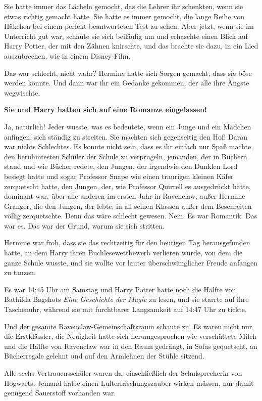 {Sie hatte immer das Lächeln gemocht, das die Lehrer ihr schenkten, wenn sie etwas richtig gemacht hatte. Sie hatte es immer gemocht, die lange Reihe von Häkchen bei einem perfekt beantworteten Test zu sehen. Aber jetzt, wenn sie im Unterricht gut war, schaute sie sich beiläufig um und erhaschte einen Blick auf Harry Potter, der mit den Zähnen knirschte, und das brachte sie dazu, in ein Lied auszubrechen, wie in einem Disney-Film.

Das war schlecht, nicht wahr? Hermine hatte sich Sorgen gemacht, dass sie böse werden könnte. Und dann war ihr ein Gedanke gekommen, der alle ihre Ängste wegwischte.

\textbf{Sie und Harry hatten sich auf eine Romanze eingelassen!}

Ja, natürlich! Jeder wusste, was es bedeutete, wenn ein Junge und ein Mädchen anfingen, sich ständig zu streiten. Sie machten sich gegenseitig den Hof! Daran war nichts Schlechtes. Es konnte nicht sein, dass es ihr einfach nur Spaß machte, den berühmtesten Schüler der Schule zu verprügeln, jemanden, der in Büchern stand und wie Bücher redete, den Jungen, der irgendwie den Dunklen Lord besiegt hatte und sogar Professor Snape wie einen traurigen kleinen Käfer zerquetscht hatte, den Jungen, der, wie Professor Quirrell es ausgedrückt hätte, dominant war, über alle anderen im ersten Jahr in Ravenclaw, außer Hermine Granger, die den Jungen, der lebte, in all seinen Klassen außer dem Besenreiten völlig zerquetschte. Denn das wäre schlecht gewesen. Nein. Es war Romantik. Das war es. Das war der Grund, warum sie sich stritten.

Hermine war froh, dass sie das rechtzeitig für den heutigen Tag herausgefunden hatte, an dem Harry ihren Buchlesewettbewerb verlieren würde, von dem die ganze Schule wusste, und sie wollte vor lauter überschwänglicher Freude anfangen zu tanzen.

Es war 14:45 Uhr am Samstag und Harry Potter hatte noch die Hälfte von Bathilda Bagshots \emph{Eine Geschichte der Magie} zu lesen, und sie starrte auf ihre Taschenuhr, während sie mit furchtbarer Langsamkeit auf 14:47 Uhr zu tickte.

Und der gesamte Ravenclaw-Gemeinschaftsraum schaute zu. Es waren nicht nur die Erstklässler, die Neuigkeit hatte sich herumgesprochen wie verschüttete Milch und die Hälfte von Ravenclaw war in den Raum gedrängt, in Sofas gequetscht, an Bücherregale gelehnt und auf den Armlehnen der Stühle sitzend.

Alle sechs Vertrauensschüler waren da, einschließlich der Schulsprecherin von Hogwarts. Jemand hatte einen Lufterfrischungszauber wirken müssen, nur damit genügend Sauerstoff vorhanden war.

}
